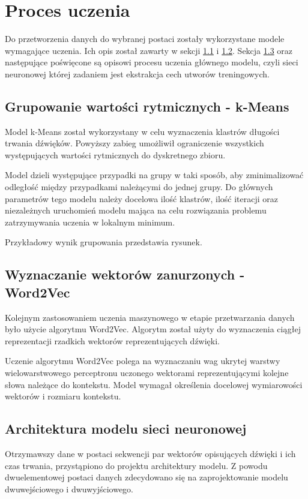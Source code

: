 \chapter{Proces uczenia} 
{
    Do przetworzenia danych do wybranej postaci zostały wykorzystane modele wymagające uczenia.
    Ich opis został zawarty w sekcji \ref{chap:models_data_k} i\,\,\ref{chap:models_data_v}. Sekcja \ref{chap:main_model} oraz następujące
    poświęcone są opisowi procesu uczenia głównego modelu, czyli sieci neuronowej której 
    zadaniem jest ekstrakcja cech utworów treningowych.

    \section{Grupowanie wartości rytmicznych - k-Means}\label{chap:models_data_k}
    {
        Model k-Means został wykorzystany w\,\,celu wyznaczenia klastrów
        długości trwania dźwięków. Powyższy zabieg umożliwił ograniczenie wszystkich występujących 
        wartości rytmicznych do dyskretnego zbioru. 
        
        Model dzieli występujące przypadki na grupy w taki sposób, aby zminimalizować odległość 
        między przypadkami należącymi do jednej grupy.
        Do głównych parametrów tego modelu należy docelowa ilość klastrów, ilość iteracji
        oraz niezależnych uruchomień modelu mająca na celu rozwiązania problemu zatrzymywania uczenia w\,\,lokalnym minimum.

        Przykładowy wynik grupowania przedstawia rysunek.
    }

    \section{Wyznaczanie wektorów zanurzonych - Word2Vec}\label{chap:models_data_v}
    {
        Kolejnym zastosowaniem uczenia maszynowego w\,\,etapie przetwarzania danych było użycie algorytmu Word2Vec. Algorytm 
        został użyty do wyznaczenia ciągłej reprezentacji rzadkich wektorów reprezentujących dźwięki.
        
        Uczenie algorytmu Word2Vec polega na wyznaczaniu wag ukrytej warstwy wielowarstwowego perceptronu
        uczonego wektorami reprezentującymi kolejne słowa należące do kontekstu.
        Model wymagał określenia docelowej wymiarowości wektorów i\,\,rozmiaru kontekstu. 
    }
    
    

    \section{Architektura modelu sieci neuronowej}\label{chap:main_model}
    {
        Otrzymawszy dane w\,\,postaci sekwencji par wektorów opisujących dźwięki i\,\,ich czas trwania,
        przystąpiono do projektu architektury modelu. Z\,\,powodu dwuelementowej postaci danych
        zdecydowano się na zaprojektowanie modelu dwuwejściowego i\,\,dwuwyjściowego.

}}
